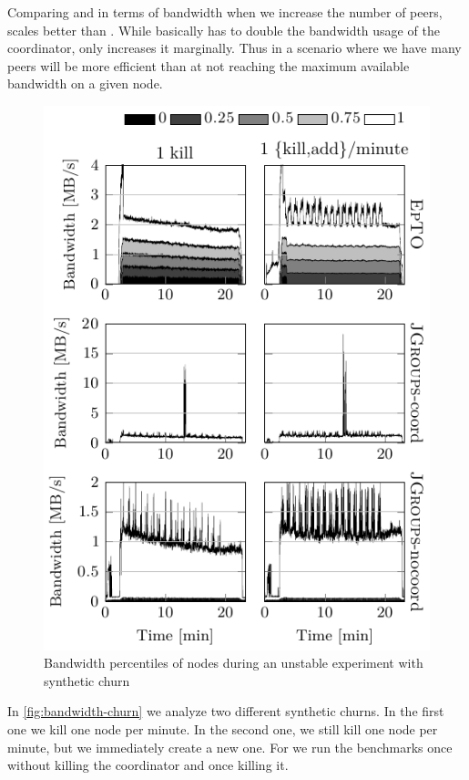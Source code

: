 Comparing \epto and \jgroups in terms of bandwidth when we increase the number of peers, \epto scales better than \jgroups. While \jgroups basically has to double the bandwidth usage of the coordinator, \epto only increases it marginally. Thus in a scenario where we have many peers \epto will be more efficient than \jgroups at not reaching the maximum available bandwidth on a given node.
 \begin{figure}[hpt]
 	\centering
 	\includegraphics[width=\linewidth]{figures/bandwidth-synth-churn.pdf}
 	\vspace{-2mm} 
 	\caption{Bandwidth percentiles of nodes during an unstable experiment with synthetic churn}
 	\vspace{-2mm} 
 	\label{fig:bandwidth-churn}
 \end{figure}
\par
In \autoref{fig:bandwidth-churn} we analyze two different synthetic churns. In the first one we kill one node per minute. In the second one, we still kill one node per minute, but we immediately create a new one. For \jgroups we run the benchmarks once without killing the coordinator and once killing it.

